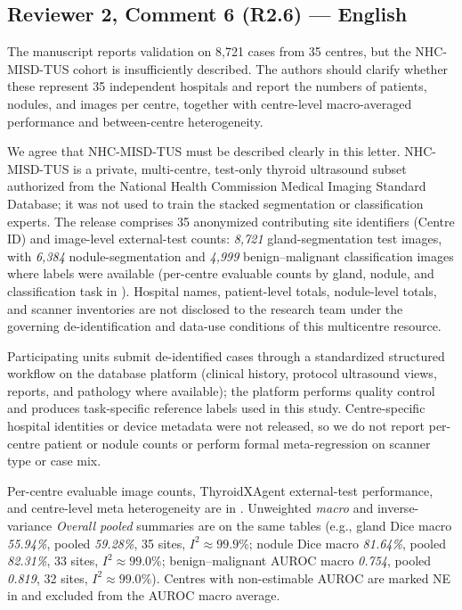 \subsection*{Reviewer 2, Comment 6 (R2.6) --- English}
\begin{reviewercomment}
The manuscript reports validation on 8,721 cases from 35 centres, but the NHC-MISD-TUS cohort is insufficiently described. The authors should clarify whether these represent 35 independent hospitals and report the numbers of patients, nodules, and images per centre, together with centre-level macro-averaged performance and between-centre heterogeneity.
\end{reviewercomment}
\begin{authorresponse}
We agree that NHC-MISD-TUS must be described clearly in this letter. NHC-MISD-TUS is a private, multi-centre, test-only thyroid ultrasound subset authorized from the National Health Commission Medical Imaging Standard Database; it was not used to train the stacked segmentation or classification experts. The release comprises 35 anonymized contributing site identifiers (Centre ID) and image-level external-test counts: \emph{8{,}721} gland-segmentation test images, with \emph{6{,}384} nodule-segmentation and \emph{4{,}999} benign--malignant classification images where labels were available (per-centre evaluable counts by gland, nodule, and classification task in ). Hospital names, patient-level totals, nodule-level totals, and scanner inventories are not disclosed to the research team under the governing de-identification and data-use conditions of this multicentre resource.\par
Participating units submit de-identified cases through a standardized structured workflow on the database platform (clinical history, protocol ultrasound views, reports, and pathology where available); the platform performs quality control and produces task-specific reference labels used in this study. Centre-specific hospital identities or device metadata were not released, so we do not report per-centre patient or nodule counts or perform formal meta-regression on scanner type or case mix.\par
Per-centre evaluable image counts, ThyroidXAgent external-test performance, and centre-level meta heterogeneity are in . Unweighted \emph{macro} and inverse-variance \emph{Overall pooled} summaries are on the same tables (e.g., gland Dice macro \emph{55.94\%}, pooled \emph{59.28\%}, 35 sites, $I^2{\approx}99.9\%$; nodule Dice macro \emph{81.64\%}, pooled \emph{82.31\%}, 33 sites, $I^2{\approx}99.0\%$; benign--malignant AUROC macro \emph{0.754}, pooled \emph{0.819}, 32 sites, $I^2{\approx}99.0\%$). Centres with non-estimable AUROC are marked NE in  and excluded from the AUROC macro average.\par
\par
\end{authorresponse}

